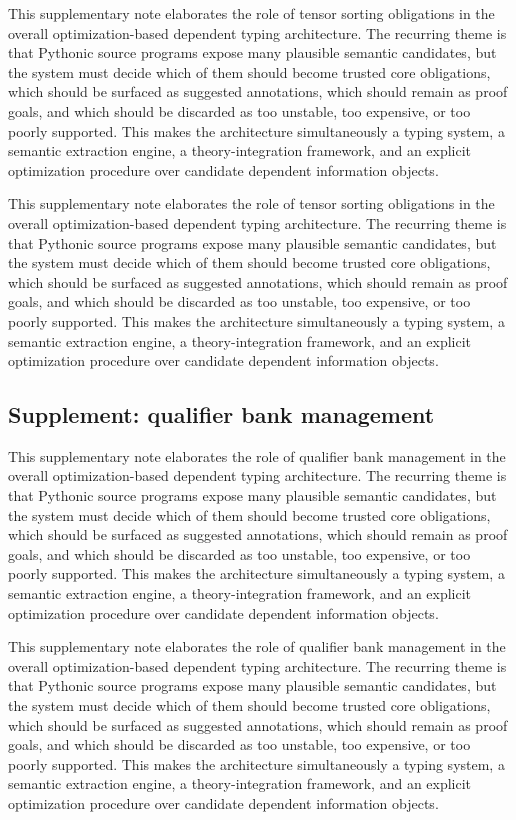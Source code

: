 \documentclass[11pt]{article}
\theoremstyle{definition}
\theoremstyle{plain}
\begin{document}
This supplementary note elaborates the role of tensor sorting obligations in the overall
optimization-based dependent typing architecture. The recurring theme is that
Pythonic source programs expose many plausible semantic candidates, but the
system must decide which of them should become trusted core obligations, which
should be surfaced as suggested annotations, which should remain as proof
goals, and which should be discarded as too unstable, too expensive, or too
poorly supported. This makes the architecture simultaneously a typing system,
a semantic extraction engine, a theory-integration framework, and an explicit
optimization procedure over candidate dependent information objects.

This supplementary note elaborates the role of tensor sorting obligations in the overall
optimization-based dependent typing architecture. The recurring theme is that
Pythonic source programs expose many plausible semantic candidates, but the
system must decide which of them should become trusted core obligations, which
should be surfaced as suggested annotations, which should remain as proof
goals, and which should be discarded as too unstable, too expensive, or too
poorly supported. This makes the architecture simultaneously a typing system,
a semantic extraction engine, a theory-integration framework, and an explicit
optimization procedure over candidate dependent information objects.

\subsection{Supplement: qualifier bank management}
This supplementary note elaborates the role of qualifier bank management in the overall
optimization-based dependent typing architecture. The recurring theme is that
Pythonic source programs expose many plausible semantic candidates, but the
system must decide which of them should become trusted core obligations, which
should be surfaced as suggested annotations, which should remain as proof
goals, and which should be discarded as too unstable, too expensive, or too
poorly supported. This makes the architecture simultaneously a typing system,
a semantic extraction engine, a theory-integration framework, and an explicit
optimization procedure over candidate dependent information objects.

This supplementary note elaborates the role of qualifier bank management in the overall
optimization-based dependent typing architecture. The recurring theme is that
Pythonic source programs expose many plausible semantic candidates, but the
system must decide which of them should become trusted core obligations, which
should be surfaced as suggested annotations, which should remain as proof
goals, and which should be discarded as too unstable, too expensive, or too
poorly supported. This makes the architecture simultaneously a typing system,
a semantic extraction engine, a theory-integration framework, and an explicit
optimization procedure over candidate dependent information objects.
\end{document}

